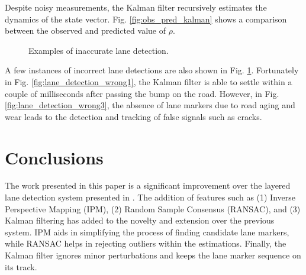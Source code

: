 \documentclass{article}
\begin{document}
Despite noisy measurements, the Kalman filter recursively estimates the dynamics of the state vector. Fig. \ref{fig:obs_pred_kalman} shows a comparison between the observed and predicted value of $\rho$.
\begin{figure}[htb!]
  \centering
  \hspace{0.00001in}
  \caption{Examples of inaccurate lane detection.}
  \label{fig:lane_detection_wrong}
\end{figure}

A few instances of incorrect lane detections are also shown in Fig. \ref{fig:lane_detection_wrong}. Fortunately in Fig. \ref{fig:lane_detection_wrong1}, the Kalman filter is able to settle within a couple of milliseconds after passing the bump on the road. However, in Fig. \ref{fig:lane_detection_wrong3}, the absence of lane markers due to road aging and wear leads to the detection and tracking of false signals such as cracks.
\section{Conclusions}
\label{sec:concl}
The work presented in this paper is a significant improvement over the layered lane detection system presented in \cite{borkar_layered_2009}. The addition of features such as (1) Inverse Perspective Mapping (IPM), (2) Random Sample Consensus (RANSAC), and (3) Kalman filtering has added to the novelty and extension over the previous system. IPM aids in simplifying the process of finding candidate lane markers, while RANSAC helps in rejecting outliers within the estimations. Finally, the Kalman filter ignores minor perturbations and keeps the lane marker sequence on its track.
\end{document}

